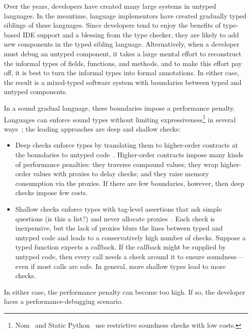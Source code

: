 
Over the years, developers have created many large systems in untyped languages.
In the meantime, language implementors have created gradually typed siblings of
these languages.  Since developers tend to enjoy the benefits of type-based IDE
support and a blessing from the type checker, they are likely to add new
components in the typed sibling language. Alternatively, when a developer must
debug an untyped component, it takes a large mental effort
to reconstruct the informal types of fields, functions, and methods, and to make
this effort pay off, it is best to turn the informal types into formal
annotations. In either case, the result is a mixed-typed software system with
boundaries between typed and untyped components.

In a sound gradual language, these boundaries impose a performance penalty.
Languages can enforce sound types without limiting
expressiveness\footnote{Nom~\cite{mt-oopsla-2017} and Static
Python~\cite{lgmvpk-pj-2023} use restrictive soundness
checks with low costs.} in several ways~\cite{type-untyped}; the leading approaches
are deep and shallow checks:
\begin{itemize}
  \item
    Deep checks enforce types by translating them to higher-order
    contracts at the boundaries to untyped code~\cite{ff-icfp-2002,tf-dls-2006,st-sfp-2006}.
    Higher-order contracts impose many kinds of performance penalties: they
    traverse compound values; they wrap higher-order values with proxies
    to delay checks; and they raise memory consumption via the proxies.
    If there are few boundaries, however, then deep checks impose few costs.

  \item
    Shallow checks enforce types with tag-level
    assertions that ask simple questions (is this a list?)
    and never allocate proxies~\cite{vss-popl-2017, vksb-dls-2014}.
    Each check is inexpensive, but the lack of proxies blurs the lines between
    typed and untyped code and leads to a conservatively high number of checks.
    Suppose a typed function expects a callback.
    If the callback might be supplied by untyped code, then every call needs
    a check around it to ensure soundness---even if most calls are safe.
    In general, more shallow types lead to more checks.

\end{itemize}
In either case, the performance penalty can become too high.
If so, the developer faces a performance-debugging scenario.

